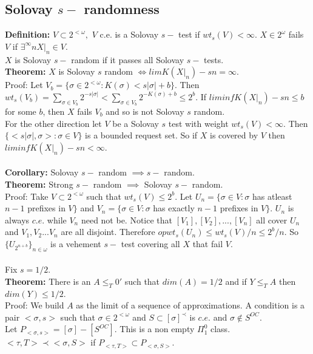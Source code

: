 \documentclass{article}
\begin{document}
   \subsection{Solovay $s-$ randomness}
   \textbf{Definition:} $V \subset 2^{< \omega},$ $V$ c.e. is a Solovay $s-$ test if $wt_s(V) < \infty$. $X \in 2^\omega$ fails $V$ if $\exists^\infty n X|_n \in V$.\\
   $X$ is Solovay $s-$ random if it passes all Solovay $s-$ tests.
   \\ \textbf{Theorem:} $X$ is Solovay $s$ random $\iff  lim K(X|_n) - sn = \infty$.\\
   Proof: Let $V_b = \{\sigma \in 2^{<\omega}: K(\sigma) < s |\sigma| + b\}$. Then $wt_s(V_b) = \sum_{\sigma \in V_b} 2^{-s|\sigma|} < \sum_{\sigma \in V_b} 2^{-K(\sigma) + b} \leq 2^b$. If $lim inf K(X|_n) - sn \leq b$ for some $b$, then $X$ fails $V_b$ and so is not Solovay $s$ random.\\
   For the other direction let $V$ be a Solovay $s$ test with weight $wt_s(V) < \infty$. Then $\{ <s|\sigma|,\sigma> : \sigma \in V\}$ is a bounded request set. So if $X$ is covered by $V$ then $lim inf K(X|_n) - sn < \infty$.\\
   \\\textbf{Corollary:} Solovay $s-$ random $\implies s-$ random.\\
   \textbf{Theorem:} Strong $s-$ random $\implies $ Solovay $s-$ random.\\
   Proof: Take $V \subset 2^{<\omega}$ such that $wt_s(V) \leq 2^b$. Let $U_n = \{\sigma \in V: \sigma $ has atleast $n-1$ prefixes in $V\}$ and $V_n = \{\sigma \in V: \sigma $ has exactly $n-1$ prefixes in $V\}$. $U_n$ is always $c.e.$ while $V_n$ need not be. Notice that $[V_1], [V_2], ..., [V_n]$ all cover $U_n$ and $V_1, V_2 ... V_n$ are all disjoint. Therefore $opwt_s(U_n) \leq wt_s(V)/n \leq 2^b/n$. So $\{U_{2^{n+b}}\}_{n \in \omega}$ is a vehement $s-$ test covering all $X$ that fail $V$. \\
   \\Fix $s= 1/2$. \\
   \textbf{Theorem:} There is an $A \leq_T0'$ such that $dim(A) = 1/2$ and if $Y \leq_TA$ then $dim(Y) \leq 1/2$.\\
   Proof: We build $A$ as the limit of a sequence of approximations. A condition is a pair $<\sigma, s>$ such that $\sigma \in 2^{<\omega}$ and $ S \subset [\sigma]^\prec$ is $c.e.$ and $\sigma \not \in S^{OC}$.\\
   Let $P_{<\sigma,s>} = [\sigma] - [S^{OC}]$. This is a non empty $\Pi^0_1$ class. $<\tau , T> \prec <\sigma,S> $ if $P_{<\tau , T>} \subset P_{<\sigma,S>}$.\\
\end{document}
